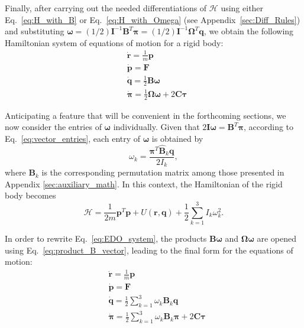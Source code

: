 \documentclass[aip,jcp,reprint,amsmath,amssymb]{revtex4-1}
\newcommand{\mt}[1]{\boldsymbol{\mathbf{#1}}}           %
\newcommand{\vt}[1]{\boldsymbol{\mathbf{#1}}}           %
\newcommand{\tr}[1]{#1^T}                               %
\begin{document}
Finally, after carrying out the needed differentiations of $\mathcal{H}$ using either Eq.~\ref{eq:H_with_B} or Eq.~\ref{eq:H_with_Omega} (see Appendix~\ref{sec:Diff_Rules}) and substituting $\vt \omega = (1/2) {\mt I}^{-1} \tr{\mt B} \vt \pi = (1/2) {\mt I}^{-1} \tr{\mt \Omega} \vt q$, we obtain the following Hamiltonian system of equations of motion for a rigid body:
\begin{subequations}
\label{eq:EDO_system}
\begin{align}
&\dot{\vt r} = \frac{1}{m} \vt p \\
&\dot{\vt p} = \mt F \\
&\dot{\vt q} = \frac{1}{2} \mt B \vt \omega \\
&\dot{\vt \pi} = \frac{1}{2} \mt \Omega \vt \omega + 2 \mt C \vt \tau
\end{align}
\end{subequations}


Anticipating a feature that will be convenient in the forthcoming sections, we now consider the entries of $\vt \omega$ individually. Given that $2{\mt I}{\vt \omega} = \tr{\mt B}{\vt \pi}$, according to Eq.~\ref{eq:vector_entries}, each entry of $\vt \omega$ is obtained by
\begin{equation}
\label{eq:omega_entry}
\omega_k = \frac{\tr{\vt \pi} \hat{\mt B}_k \vt q}{2 I_k},
\end{equation}
where $\mt B_k$ is the corresponding permutation matrix among those presented in Appendix \ref{sec:auxiliary_math}. In this context, the Hamiltonian of the rigid body becomes
\[
\mathcal{H} = \frac{1}{2m} \tr{\vt p} \vt p + U(\vt r, \vt q) + \frac{1}{2} \sum_{k=1}^3 I_k \omega_k^2.
\]

In order to rewrite Eq.~\ref{eq:EDO_system}, the products $\mt B \vt \omega$ and $\mt \Omega \vt \omega$ are opened using Eq.~\ref{eq:product_B_vector}, leading to the final form for the equations of motion:
\begin{subequations}
\label{eq:EDO_system_alternative}
\begin{align}
&\dot{\vt r} = \frac{1}{m} \vt p \\
&\dot{\vt p} = \vt F \\
&\dot{\vt q} = \frac{1}{2} \sum_{k=1}^3 \omega_k {\mt B}_k \vt q \label{eq:edo_q} \\
&\dot{\vt \pi} = \frac{1}{2} \sum_{k=1}^3 \omega_k {\mt B}_k \vt \pi + 2 \mt C \vt \tau \label{eq:edo_pi}
\end{align}
\end{subequations}
\end{document}

